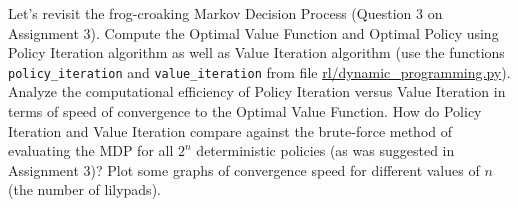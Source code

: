 \documentclass[12pt]{exam}
\begin{document}
\begin{questions}
\question Let's revisit the frog-croaking Markov Decision Process (Question 3 on Assignment 3). Compute the Optimal Value Function and Optimal Policy using Policy Iteration algorithm as well as Value Iteration algorithm (use the functions \lstinline{policy_iteration} and \lstinline{value_iteration} from file \href{https://github.com/TikhonJelvis/RL-book/blob/master/rl/dynamic_programming.py}{rl\//dynamic\_programming.py}). Analyze the computational efficiency of Policy Iteration versus Value Iteration in terms of speed of convergence to the Optimal Value Function. How do Policy Iteration and Value Iteration compare against the brute-force method of evaluating the MDP for all $2^n$ deterministic policies (as was suggested in Assignment 3)? Plot some graphs of convergence speed for different values of $n$ (the number of lilypads).

\end{questions}
\end{document}
